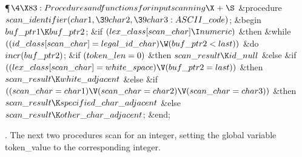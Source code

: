 \Y\P$\4\X83:Procedures and functions for input scanning\X\mathrel{+}\S$\6
\4\&{procedure}\1\  $\\{scan\_identifier}(\\{char1},\39\\{char2},\39%
\\{char3}:\\{ASCII\_code})$;\2\6
\&{begin} $\\{buf\_ptr1}\K\\{buf\_ptr2}$;\6
\&{if} $(\\{lex\_class}[\\{scan\_char}]\I\\{numeric})$ \1\&{then}\6
\&{while} $((\\{id\_class}[\\{scan\_char}]=\\{legal\_id\_char})\W(\\{buf%
\_ptr2}<\\{last}))$ \1\&{do}\5
$\\{incr}(\\{buf\_ptr2})$;\2\2\6
\&{if} $(\\{token\_len}=0)$ \1\&{then}\5
$\\{scan\_result}\K\\{id\_null}$\6
\4\&{else} \&{if} $((\\{lex\_class}[\\{scan\_char}]=\\{white\_space})\V(\\{buf%
\_ptr2}=\\{last}))$ \1\&{then}\5
$\\{scan\_result}\K\\{white\_adjacent}$\6
\4\&{else} \&{if} $((\\{scan\_char}=\\{char1})\V(\\{scan\_char}=\\{char2})\V(%
\\{scan\_char}=\\{char3}))$ \1\&{then}\5
$\\{scan\_result}\K\\{specified\_char\_adjacent}$\6
\4\&{else} $\\{scan\_result}\K\\{other\_char\_adjacent}$;\2\2\2\6
\&{end};\par
\fi

.
The next two procedures scan for an integer, setting the global
variable \\{token\_value} to the corresponding integer.

